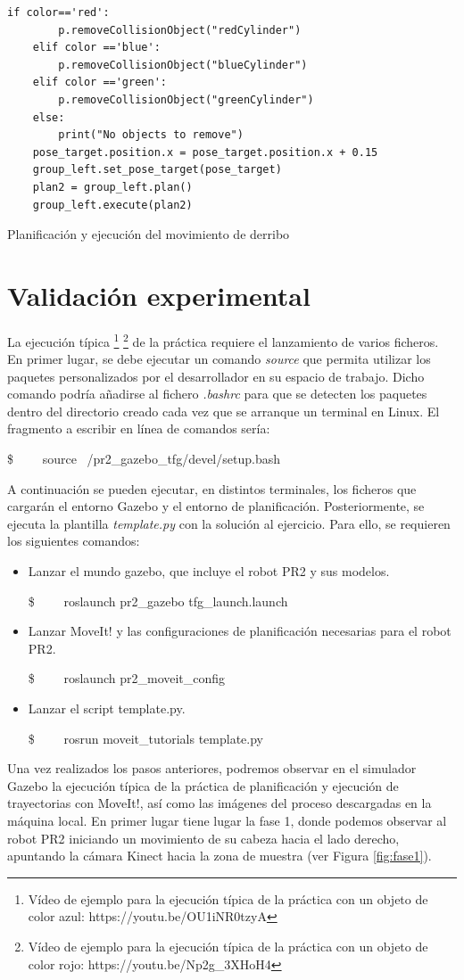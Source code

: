 \documentclass[12pt,spanish,chapterprefix, numbers=noenddot]{book}
\numberwithin{equation}{section}
\numberwithin{figure}{section}
\begin{document}
\begin{algorithm}[htb!]
    \begin{lstlisting}[frame=single] 
    if color=='red':
        p.removeCollisionObject("redCylinder")
    elif color =='blue':
        p.removeCollisionObject("blueCylinder")
    elif color =='green':
        p.removeCollisionObject("greenCylinder")
    else:
        print("No objects to remove")
    pose_target.position.x = pose_target.position.x + 0.15
    group_left.set_pose_target(pose_target)
    plan2 = group_left.plan()
    group_left.execute(plan2)
    \end{lstlisting}
\caption{\label{alg:derribo}Planificación y ejecución del movimiento de derribo}
\end{algorithm}

\section{Validación experimental}
La ejecución típica \footnote{Vídeo de ejemplo para la ejecución típica de la práctica con un objeto de color azul: https://youtu.be/OU1iNR0tzyA} \footnote{Vídeo de ejemplo para la ejecución típica de la práctica con un objeto de color rojo: https://youtu.be/Np2g\_3XHoH4} de la práctica requiere el lanzamiento de varios ficheros. En primer lugar, se debe ejecutar un comando \textit{source} que permita utilizar los paquetes personalizados por el desarrollador en su espacio de trabajo. Dicho comando podría añadirse al fichero \textit{.bashrc} para que se detecten los paquetes dentro del directorio creado cada vez que se arranque un terminal en Linux. El fragmento a escribir en línea de comandos sería: 

\$ \ \ \ \ source ~/pr2\_gazebo\_tfg/devel/setup.bash

A continuación se pueden ejecutar, en distintos terminales, los ficheros que cargarán el entorno Gazebo y el entorno de planificación. Posteriormente, se ejecuta la plantilla \textit{template.py} con la solución al ejercicio. Para ello, se requieren los siguientes comandos: 
\begin{itemize}
    \item Lanzar el mundo gazebo, que incluye el robot PR2 y sus modelos.
    
    \$ \ \ \ \ roslaunch pr2\_gazebo tfg\_launch.launch
    \item Lanzar MoveIt! y las configuraciones de planificación necesarias para el robot PR2.
    
    \$ \ \ \ \ roslaunch pr2\_moveit\_config 
    \item Lanzar el script template.py.
    
    \$ \ \ \ \ rosrun moveit\_tutorials template.py
\end{itemize}
Una vez realizados los pasos anteriores, podremos observar en el simulador Gazebo la ejecución típica de la práctica de planificación y ejecución de trayectorias con MoveIt!, así como las imágenes del proceso descargadas en la máquina local. 
En primer lugar tiene lugar la fase 1, donde podemos observar al robot PR2 iniciando un movimiento de su cabeza hacia el lado derecho, apuntando la cámara Kinect hacia la zona de muestra (ver Figura \ref{fig:fase1}).
\end{document}
